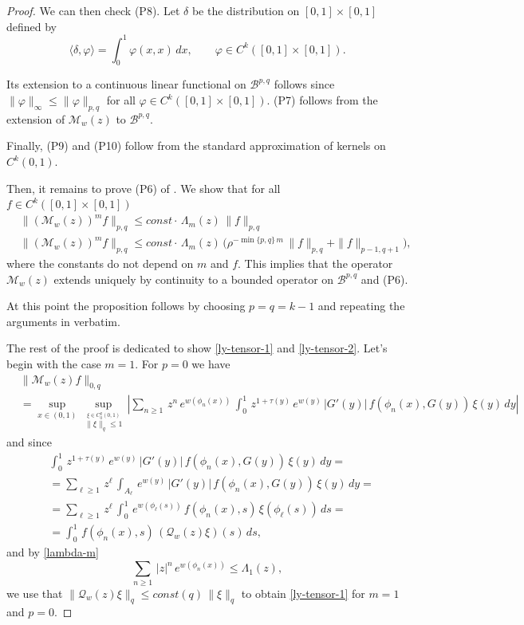 \documentclass[11pt]{amsart}
\theoremstyle{definition}
\theoremstyle{remark}
\theoremstyle{definition}
\numberwithin{equation}{section}
\newcommand{\BB}{\mathcal{B}}
\newcommand{\QQ}{\mathcal{Q}}
\newcommand{\MM}{\mathcal{M}}
\begin{document}
\begin{proof}
{We can then check (P8).} Let $\delta$ be the distribution on $[0,1]\times[0,1]$ defined by
\[
\langle \delta,\varphi\rangle = \int_0^1 \varphi(x,x)\,dx,
\qquad \varphi\in C^k([0,1]\times[0,1]).
\]
{Its extension to a continuous linear functional on $\BB^{p,q}$ follows since $\| \varphi\|_\infty \le \|\varphi \|_{p,q}$ for all $\varphi\in C^k([0,1]\times[0,1])$. (P7) follows from the extension of $\MM_w(z)$ to $\BB^{p,q}$.

Finally, (P9) and (P10) follow from the standard approximation of kernels on $C^k(0,1)$.

Then, it remains to prove (P6) of \cite{LT}.  We show that for all 
$f\in C^k([0,1]\times[0,1])$
\begin{align}
& \| (\MM_w(z))^m f \|_{p,q} \le const \cdot\, \Lambda_m(z)\, \| f \|_{p,q}  \label{ly-tensor-1} \\[0.2cm]
& \| (\MM_w(z))^m f \|_{p,q} \le const \cdot\, \Lambda_m(z)\, \Big( \rho^{-\min\{p,q\}\, m}\, \| f \|_{p,q} + \| f \|_{p-1,q+1}\Big), \label{ly-tensor-2}
\end{align}
where the constants do not depend on $m$ and $f$. This implies that the operator $\MM_w(z)$ extends uniquely by continuity to a bounded operator on $\BB^{p,q}$ and (P6).

At this point the proposition follows by choosing $p=q=k-1$ and repeating the arguments in \cite[Section 4]{LT} verbatim.} 

The rest of the proof is dedicated to show \eqref{ly-tensor-1} and \eqref{ly-tensor-2}. Let's begin with the case $m=1$. For $p=0$ we have
\[
\begin{split}
&\| \MM_w(z) f \|_{0,q} \\
&= \sup_{x\in (0,1)}\, \sup_{\stackrel{\xi \in C^{q}_0(0,1)}{\|\xi\|_{q}\le1}}\, \left|\sum_{n\ge 1}\, z^n\, e^{w(\phi_n(x))}\, \int_0^1\, z^{1+\tau(y)}\, e^{w(y)}\, |G'(y)|\, f(\phi_n(x),G(y))\, \xi(y)\, dy \right|
\end{split}
\]
and since
\[
\begin{split}
&\int_0^1\, z^{1+\tau(y)}\, e^{w(y)}\, |G'(y)|\, f(\phi_n(x),G(y))\, \xi(y)\, dy= \\
 &=\sum_{\ell \ge 1}\, z^{\ell}\, \int_{A_\ell}\, e^{w(y)}\, |G'(y)|\, f(\phi_n(x),G(y))\, \xi(y)\, dy= \\
&= \sum_{\ell \ge 1}\, z^{\ell}\, \int_0^1\, e^{w(\phi_\ell(s))}\, f(\phi_n(x),s)\, \xi(\phi_\ell(s))\, ds= \\
&= \int_0^1\, f(\phi_n(x),s)\, (\QQ_w(z) \xi)(s)\, ds,
\end{split}
\] 
and by \eqref{lambda-m}
\[
\sum_{n\ge 1}\, |z|^n\, e^{w(\phi_n(x))} \le \Lambda_1(z),
\]
we use that $\| \QQ_w(z) \xi\|_q \le const(q)\, \|\xi\|_q$ to obtain \eqref{ly-tensor-1} for $m=1$ and $p=0$.


\end{proof}
\end{document}
